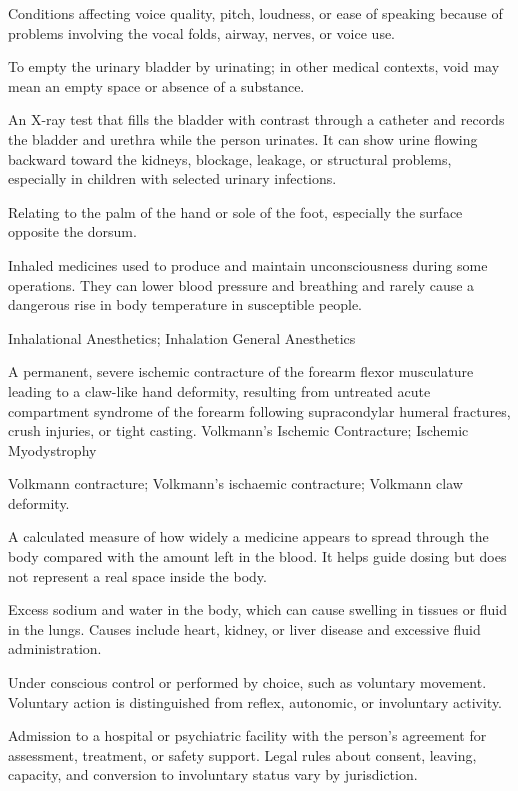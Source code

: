  Conditions affecting voice quality, pitch, loudness, or ease of speaking because of problems involving the vocal folds, airway, nerves, or voice use.

 To empty the urinary bladder by urinating; in other medical contexts, void may mean an empty space or absence of a substance.

 An X-ray test that fills the bladder with contrast through a catheter and records the bladder and urethra while the person urinates. It can show urine flowing backward toward the kidneys, blockage, leakage, or structural problems, especially in children with selected urinary infections.

 Relating to the palm of the hand or sole of the foot, especially the surface opposite the dorsum.

 Inhaled medicines used to produce and maintain unconsciousness during some operations. They can lower blood pressure and breathing and rarely cause a dangerous rise in body temperature in susceptible people.

\synonyms
Inhalational Anesthetics; Inhalation General Anesthetics

 A permanent, severe ischemic contracture of the forearm flexor musculature leading to a claw-like hand deformity, resulting from untreated acute compartment syndrome of the forearm following supracondylar humeral fractures, crush injuries, or tight casting.
\synonyms
Volkmann's Ischemic Contracture; Ischemic Myodystrophy

\synonyms Volkmann contracture; Volkmann's ischaemic contracture; Volkmann claw deformity.

 A calculated measure of how widely a medicine appears to spread through the body compared with the amount left in the blood. It helps guide dosing but does not represent a real space inside the body.

 Excess sodium and water in the body, which can cause swelling in tissues or fluid in the lungs. Causes include heart, kidney, or liver disease and excessive fluid administration.

 Under conscious control or performed by choice, such as voluntary movement. Voluntary action is distinguished from reflex, autonomic, or involuntary activity.

 Admission to a hospital or psychiatric facility with the person’s agreement for assessment, treatment, or safety support. Legal rules about consent, leaving, capacity, and conversion to involuntary status vary by jurisdiction.


